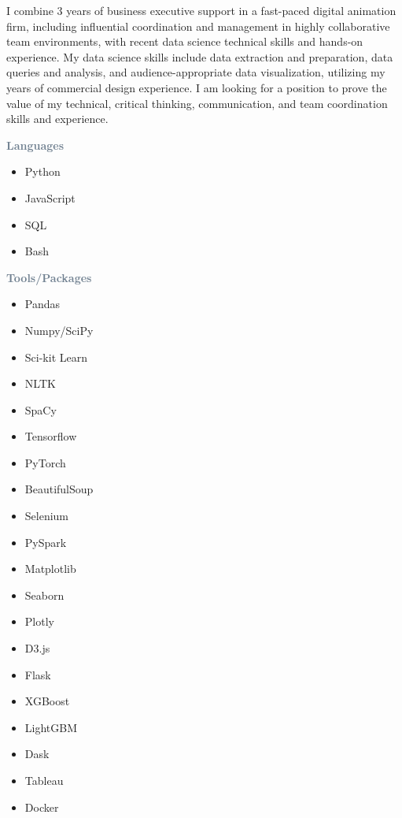 



I combine 3 years of business executive support in a fast-paced digital animation firm, including influential coordination and management in highly collaborative team environments, with recent data science technical skills and hands-on experience. My data science skills include data extraction and preparation, data queries and analysis, and audience-appropriate data visualization, utilizing my years of commercial design experience. I am looking for a position to prove the value of my technical, critical thinking, communication, and team coordination skills and experience.


\textcolor{SlateGrey}{\textbf{Languages}}
\begin{multicols}{2}
    \begin{itemize}
        \item Python
        \item JavaScript
        \item SQL
        \item Bash
    \end{itemize}
\end{multicols}

\textcolor{SlateGrey}{\textbf{Tools/Packages}}
\begin{multicols}{2}
    \begin{itemize}
        \item Pandas
        \item Numpy/SciPy
        \item Sci-kit Learn
        \item NLTK
        \item SpaCy
        \item Tensorflow
        \item PyTorch
        \item BeautifulSoup
        \item Selenium
        \item PySpark
        \item Matplotlib
        \item Seaborn
        \item Plotly
        \item D3.js
        \item Flask
        \item XGBoost
        \item LightGBM
        \item Dask
        \item Tableau
        \item Docker
    \end{itemize}
\end{multicols}

